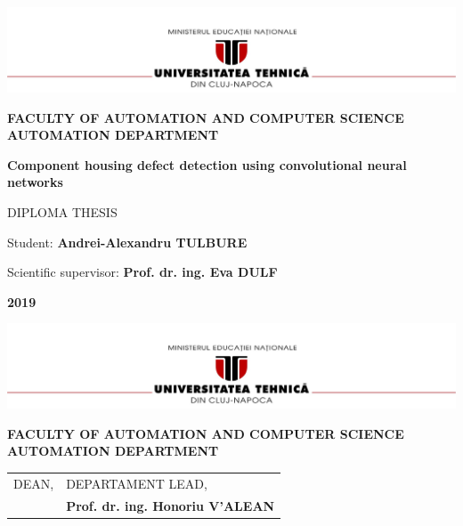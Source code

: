\documentclass[12pt,a4paper,twoside]{report}
\renewcommand{\thesisauthor}{Andrei-Alexandru TULBURE}    %
\renewcommand{\thesisyear}{2019}      %
\renewcommand{\thesistitle}{Component housing defect detection using convolutional neural networks} %
\renewcommand{\thesissupervisor}{Prof. dr. ing. Eva DULF}
\newcommand{\department}{FACULTY OF AUTOMATION AND COMPUTER SCIENCE\\
AUTOMATION DEPARTMENT}
\newcommand{\thesis}{DIPLOMA THESIS}
\newcommand{\utcnlogo}{\includegraphics[width=15cm]{img/utcn.jpg}}
\begin{document}

\newenvironment{definition}[1][Defini'tie.]{\begin{trivlist}
\item[\hskip \labelsep {\bfseries #1}]}{\end{trivlist}}


\begin{center}


\utcnlogo

{\bf \department}

\vspace{4cm}

{\bf \thesistitle} %

\vspace{1.5cm}

\thesis

\vspace{5cm}

Student: {\bf \thesisauthor} 

Scientific supervisor: {\bf \thesissupervisor}

\vspace{3cm}
{\bf \thesisyear}
\end{center}

\thispagestyle{empty}
\newpage

\begin{center}
\utcnlogo

{\bf \department}
\end{center}
\vspace{0.5cm}

\begin{tabular}{p{6cm}p{8cm}}
 \hspace{-1cm}DEAN, & DEPARTAMENT LEAD,\\
\hspace{-1cm}{\bf Prof. dr. ing. Liviu MICLEA} & {\bf Prof. dr. ing. Honoriu V'ALEAN}\\  
\end{tabular}
 
\vspace{1cm}
\end{document}
